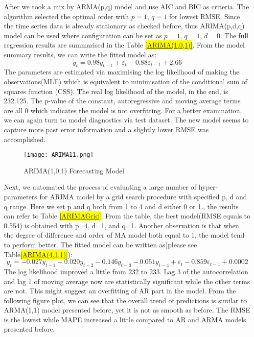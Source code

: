 After we took a mix by ARMA(p,q) model and use AIC and BIC as criteria. The algorithm selected the optimal order with $p=1$, $q=1$ for lowest RMSE. Since the time series data is already stationary as checked before, thus ARIMA(p,d,q) model can be used where configuration can be set as $p=1$, $q=1$, $d=0$. The full regression results are summarised in the Table \hl{\ref{ARIMA(1,0,1)}}. From the model summary results, we can write the fitted model as: 
\begin{equation}
y_t=0.98y_{t-1}+\varepsilon_t-0.88\varepsilon_{t-1}+2.66
\end{equation}
The parameters are estimated via maximising the log likelihood of making the observations(MLE) which is equivalent to minimisation of the conditional sum of squares function (CSS). The real log likelihood of the model, in the end, is 232.125. The p-value of the constant, autoregressive and moving average terms are all 0 which indicates the model is not overfitting. For a better examination, we can again turn to model diagnostics via test dataset. The new model seems to capture more past error information and a slightly lower RMSE was accomplished. 
\begin{figure}[H]
  \centering
  \texttt{[image: ARIMA11.png]}
  \caption{ARIMA(1,0,1) Forecasting Model}
\end{figure}
Next, we automated the process of evaluating a large number of  hyper-parameters for ARIMA model by a grid search procedure with specified p, d and q range. Here we set p and q both from 1 to 4 and d either 0 or 1., the results can refer to Table \hl{\ref{ARIMAGrid}}. From the table, the best model(RMSE equals to 0.554) is obtained  with p=4, d=1, and q=1. Another observation is that when the degree of difference and order of MA model both equal to 1, the model tend to perform better. The fitted model can be written as(please see Table\hl{\ref{ARIMA(4,1,1)}}):
\begin{equation}
y_t=-0.027y_{t-1}-0.020y_{t-2}-0.146y_{t-3}-0.051y_{t-4}+\varepsilon_t-0.859\varepsilon_{t-1}+0.0002
\end{equation}
The log likelihood improved a little from 232 to 233. Lag 3 of the autocorrelation and lag 1 of moving average now are statistically significant while the other terms are not. This might suggest an overfitting of AR part in the model. From the following figure plot, we can see that the overall trend of predictions is similar to ARMA(1,1) model presented before, yet it is not as smooth as before. The RMSE is the lowest while MAPE increased a little compared to AR and ARMA models presented before. 
